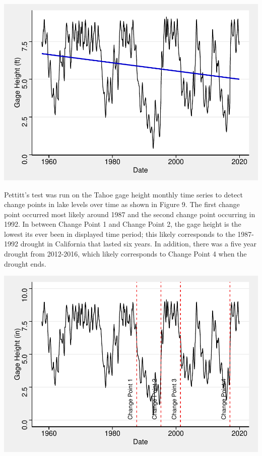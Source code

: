 \documentclass[12pt,]{article}
\let\origfigure\figure
\let\endorigfigure\endfigure
\renewenvironment{figure}[1][2] {
    \expandafter\origfigure\expandafter[H]
} {
    \endorigfigure
}
\begin{document}
\begin{figure}
\centering
\includegraphics{Shintaku_ENV872_Project_files/figure-latex/unnamed-chunk-11-1.pdf}
\caption{Monthly Mean Gage Height Data with Sen's Slope Trend}
\end{figure}

Pettitt's test was run on the Tahoe gage height monthly time series to
detect change points in lake levels over time as shown in Figure 9. The
first change point occurred most likely around 1987 and the second
change point occurring in 1992. In between Change Point 1 and Change
Point 2, the gage height is the lowest its ever been in displayed time
period; this likely corresponds to the 1987-1992 drought in California
that lasted six years. In addition, there was a five year drought from
2012-2016, which likely corresponds to Change Point 4 when the drought
ends.

\begin{figure}
\centering
\includegraphics{Shintaku_ENV872_Project_files/figure-latex/unnamed-chunk-12-1.pdf}
\caption{Change points in lake level}
\end{figure}
\end{document}
